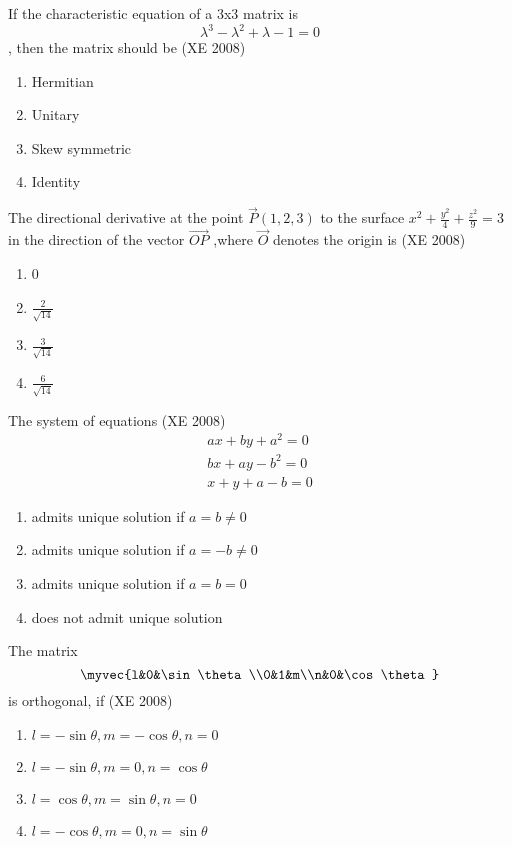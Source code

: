 \item If the characteristic equation of a 3x3 matrix is $$\lambda^3 - \lambda^2 + \lambda - 1 =0$$, then the matrix should be 
(XE 2008)
\begin{multicols}{4}
\begin{enumerate}
\item  Hermitian 
\item Unitary
 \item Skew symmetric
\item Identity
\end{enumerate}
\end{multicols}
\item The directional derivative at the point $\vec{P}(1,2,3)$ to the surface {\large $x^2 + \frac{y^2}{4} + \frac{z^2}{9} =3$} in the direction of the vector $\overrightarrow{OP}$ ,where $\vec{O}$ denotes the origin is
(XE 2008)
\begin{multicols}{4}
\begin{enumerate}
\item 0
\item {$\frac{2}{\sqrt{14}}$}
\item {$\frac{3}{\sqrt{14}}$}
\item {$\frac{6}{\sqrt{14}}$}
\end{enumerate}
\end{multicols}
\item The system of equations 
(XE 2008)
	\begin{align*}	 ax+by+a^2=0  \\ bx+ay-b^2=0 \\ x+y+a-b=0
	\end{align*}
\begin{enumerate}
\item  admits unique solution if $a=b\ne 0$
\item admits unique solution if $a=-b\ne 0$
\item admits unique solution if $a=b=0$
\item does not admit unique solution
\end{enumerate}
\item The matrix $$\myvec{l&0&\sin\theta\\0&1&m\\n&0&\cos\theta}$$ is orthogonal, if
(XE 2008)
\begin{multicols}{2}
\begin{enumerate}
\item $l=-\sin\theta, m=-\cos\theta, n=0$
\item $l=-\sin\theta, m=0, n=\cos\theta$
\item $l=\cos\theta, m=\sin\theta, n=0$
\item $l=-\cos\theta, m=0, n=\sin\theta$
\end{enumerate}
\end{multicols}

